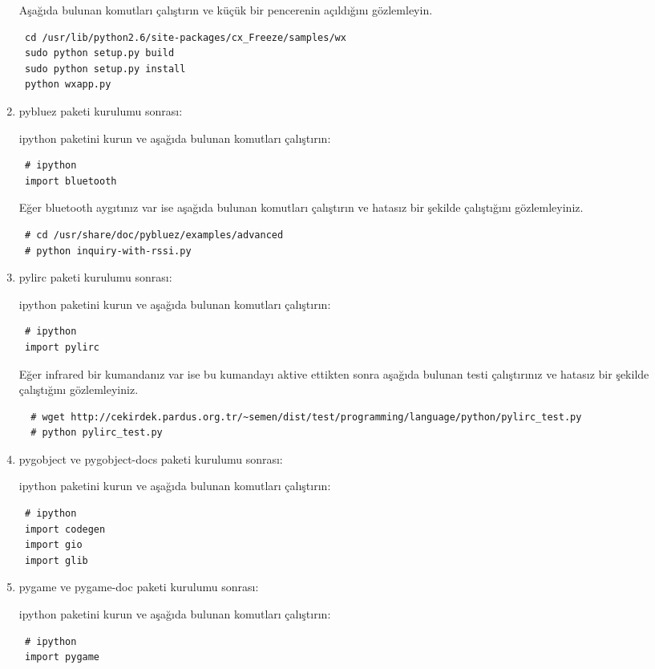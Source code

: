 \documentclass[a4paper,10pt]{article}
\begin{document}
\begin{enumerate}
Aşağıda bulunan komutları çalıştırın ve küçük bir pencerenin açıldığını gözlemleyin.
\begin{verbatim}
 cd /usr/lib/python2.6/site-packages/cx_Freeze/samples/wx
 sudo python setup.py build
 sudo python setup.py install
 python wxapp.py
\end{verbatim}


\item pybluez paketi kurulumu sonrası:

ipython paketini kurun ve aşağıda bulunan komutları çalıştırın:
\begin{verbatim}
 # ipython
 import bluetooth
\end{verbatim}

Eğer bluetooth aygıtınız var ise aşağıda bulunan komutları çalıştırın ve hatasız bir şekilde çalıştığını gözlemleyiniz.
\begin{verbatim}
 # cd /usr/share/doc/pybluez/examples/advanced
 # python inquiry-with-rssi.py
\end{verbatim}



\item pylirc paketi kurulumu sonrası:

ipython paketini kurun ve aşağıda bulunan komutları çalıştırın:
\begin{verbatim}
 # ipython
 import pylirc
\end{verbatim}

Eğer infrared bir kumandanız var ise bu kumandayı aktive ettikten sonra aşağıda bulunan testi çalıştırınız ve hatasız bir şekilde çalıştığını gözlemleyiniz.
\begin{verbatim}
  # wget http://cekirdek.pardus.org.tr/~semen/dist/test/programming/language/python/pylirc_test.py
  # python pylirc_test.py
\end{verbatim}


\item pygobject ve pygobject-docs paketi kurulumu sonrası:

ipython paketini kurun ve aşağıda bulunan komutları çalıştırın:
\begin{verbatim}
 # ipython
 import codegen
 import gio
 import glib
\end{verbatim}
\item pygame ve pygame-doc paketi kurulumu sonrası:

ipython paketini kurun ve aşağıda bulunan komutları çalıştırın:
\begin{verbatim}
 # ipython
 import pygame
\end{verbatim}


\end{enumerate}
\end{document}
